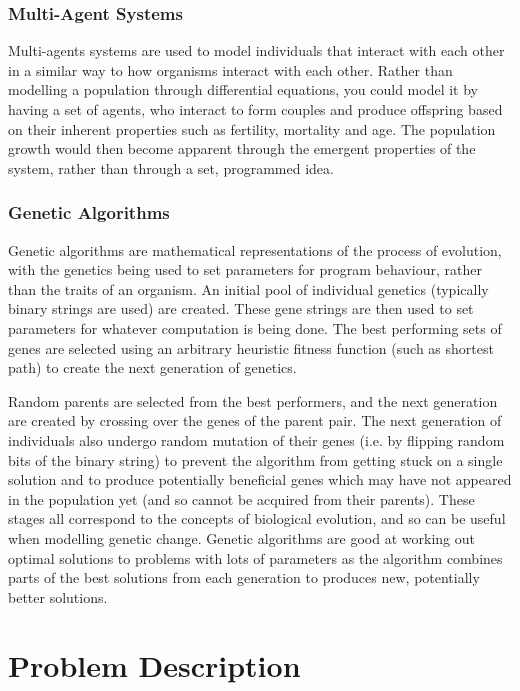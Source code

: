 \documentclass[authoryearcitations]{UoYCSproject}
\begin{document}
\subsection{Multi-Agent Systems}
Multi-agents systems are used to model individuals that interact with each other in a similar way to how organisms interact with each other. Rather than modelling a population through differential equations, you could model it by having a set of agents, who interact to form couples and produce offspring based on their inherent properties such as fertility, mortality and age. The population growth would then become apparent through the emergent properties of the system, rather than through a set, programmed idea.

\subsection{Genetic Algorithms}
Genetic algorithms are mathematical representations of the process of evolution, with the genetics being used to set parameters for program behaviour, rather than the traits of an organism. An initial pool of individual genetics (typically binary strings are used) are created. These gene strings are then used to set parameters for whatever computation is being done. The best performing sets of genes are selected using an arbitrary heuristic fitness function (such as shortest path) to create the next generation of genetics. 

Random parents are selected from the best performers, and the next generation are created by crossing over the genes of the parent pair. The next generation of individuals also undergo random mutation of their genes (i.e. by flipping random bits of the binary string) to prevent the algorithm from getting stuck on a single solution and to produce potentially beneficial genes which may have not appeared in the population yet (and so cannot be acquired from their parents). These stages all correspond to the concepts of biological evolution, and so can be useful when modelling genetic change. Genetic algorithms are good at working out optimal solutions to problems with lots of parameters as the algorithm combines parts of the best solutions from each generation to produces new, potentially better solutions. 


\chapter{Problem Description}
\label{cha:Problem Description}
\end{document}
